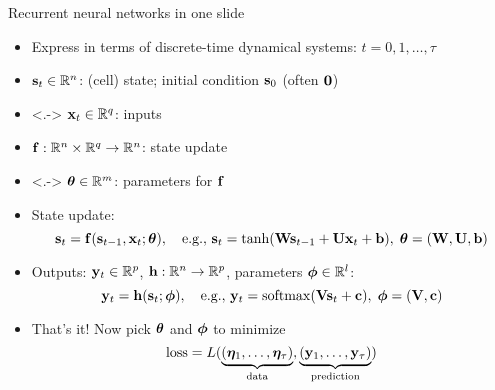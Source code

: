\begin{frame}{Recurrent neural networks in one slide}
    \begin{itemize}[<+->]
        \item Express in terms of discrete-time dynamical systems: $t = 0, 1, \dots, \tau$
        \item $\mathbf{s}_t \in \mathbb{R}^n$: (cell) state; initial condition $\mathbf{s}_0$ (often $\mathbf{0}$)
        \item<.-> $\mathbf{x}_t \in \mathbb{R}^q$: inputs
        \item $\mathbf{f}: \mathbb{R}^n \times \mathbb{R}^q \to \mathbb{R}^n$: state update
        \item<.-> $\bm{\theta} \in \mathbb{R}^m$: parameters for $\mathbf{f}$
        \item State update:
        \begin{equation*}
            \mathbf{s}_t = \mathbf{f}(\mathbf{s}_{t-1}, \mathbf{x}_t; \bm{\theta}),
            \quad \text{e.g.}, \,
            \mathbf{s}_t = \tanh(\mathbf{W} \mathbf{s}_{t-1} + \mathbf{U} \mathbf{x}_t + \mathbf{b}), \;
            \bm{\theta} = (\mathbf{W}, \mathbf{U}, \mathbf{b})
        \end{equation*}
        \item Outputs: $\mathbf{y}_t \in \mathbb{R}^p$, $\mathbf{h}: \mathbb{R}^n \to \mathbb{R}^p$, parameters $\bm{\phi} \in \mathbb{R}^l$:
        \begin{equation*}
            \mathbf{y}_t = \mathbf{h}(\mathbf{s}_t; \bm{\phi}),
            \quad \text{e.g.}, \,
            \mathbf{y}_t = \mathrm{softmax}(\mathbf{V} \mathbf{s}_{t} + \mathbf{c}), \;
            \bm{\phi} = (\mathbf{V}, \mathbf{c})
        \end{equation*}
        \item That's it!  Now pick $\bm{\theta}$ and $\bm{\phi}$ to minimize
        \begin{equation*}
            \mathrm{loss} = L(
                \underbrace{(\bm{\eta}_1, \dots, \bm{\eta}_\tau)}_\text{data},
                \underbrace{(\mathbf{y}_1, \dots, \mathbf{y}_\tau)}_\text{prediction}
            )
        \end{equation*}
    \end{itemize}
\end{frame}

